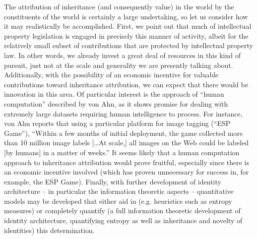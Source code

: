 \documentclass[pra,twocolumn,groupedaddress,10pt]{revtex4}
\theoremstyle{definition}
\begin{document}
The attribution of inheritance (and consequently value) in the world by the constituents of the world is certainly a large undertaking, so let us consider how it may realistically be accomplished. First, we point out that much of intellectual property legislation is engaged in precisely this manner of activity, albeit for the relatively small subset of contributions that are protected by intellectual property law. In other words, we already invest a great deal of resources in this kind of pursuit, just not at the scale and generality we are presently talking about. Additionally, with the possibility of an economic incentive for valuable contributions toward inheritance attribution, we can expect that there would be innovation in this area. Of particular interest is the approach of ``human computation'' described by von Ahn\cite{vonahn}, as it shows promise for dealing with extremely large datasets requiring human intelligence to process. For instance, von Ahn reports that using a particular platform for image tagging (``ESP Game''), ``Within a few months of initial deployment, the game collected more than 10 million image labels [\ldots At scale,] all images on the Web could be labeled [by humans] in a matter of weeks.'' It seems likely that a human computation approach to inheritance attribution would prove fruitful, especially since there is an economic incentive involved (which has proven unnecessary for success in, for example, the ESP Game). Finally, with further development of identity architecture -- in particular the information theoretic aspects -- quantitative models may be developed that either aid in (e.g. heuristics such as entropy measures) or completely quantify (a full information theoretic development of identity architecture, quantifying entropy as well as inheritance and novelty of identities) this determination.
\end{document}
